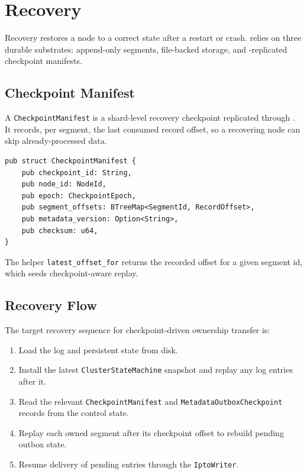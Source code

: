 \section{Recovery}
\label{sec:recovery}

Recovery restores a node to a correct state after a restart or crash. \vannak{}
relies on three durable substrates: append-only segments, file-backed \raft{}
storage, and \raft{}-replicated checkpoint manifests.

\subsection{Checkpoint Manifest}

A \texttt{CheckpointManifest} is a shard-level recovery checkpoint replicated
through \raft{}. It records, per segment, the last consumed record offset, so a
recovering node can skip already-processed data.

\begin{lstlisting}
pub struct CheckpointManifest {
    pub checkpoint_id: String,
    pub node_id: NodeId,
    pub epoch: CheckpointEpoch,
    pub segment_offsets: BTreeMap<SegmentId, RecordOffset>,
    pub metadata_version: Option<String>,
    pub checksum: u64,
}
\end{lstlisting}

The helper \texttt{latest\_offset\_for} returns the recorded offset for a given
segment id, which seeds checkpoint-aware replay.

\subsection{Recovery Flow}

The target recovery sequence for checkpoint-driven ownership transfer is:

\begin{enumerate}
\item Load the \raft{} log and persistent state from disk.
\item Install the latest \texttt{ClusterStateMachine} snapshot and replay any
  log entries after it.
\item Read the relevant \texttt{CheckpointManifest} and
  \texttt{MetadataOutboxCheckpoint} records from the control state.
\item Replay each owned segment after its checkpoint offset to rebuild pending
  outbox state.
\item Resume delivery of pending entries through the \texttt{IptoWriter}.
\end{enumerate}

